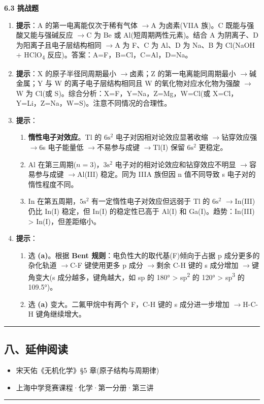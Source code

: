 \documentclass[a4paper,11pt]{ctexart}
\providecommand{\tightlist}{\setlength{\itemsep}{0pt}\setlength{\parskip}{0pt}}
\newcommand{\箭}{\ensuremath{\rightarrow}}
\newcommand{\左箭}{\ensuremath{\leftarrow}}
\newcommand{\上箭}{\ensuremath{\uparrow}}
\newcommand{\下箭}{\ensuremath{\downarrow}}
\newcommand{\衡}{\ensuremath{\rightleftharpoons}}
\newcommand{\双箭}{\ensuremath{\leftrightarrow}}
\newcommand{\约等于}{\ensuremath{\approx}}
\newcommand{\小于等于}{\ensuremath{\leq}}
\newcommand{\大于等于}{\ensuremath{\geq}}
\newcommand{\不等于}{\ensuremath{\neq}}
\newcommand{\西格马}{\ensuremath{\sigma}}
\newcommand{\派}{\ensuremath{\pi}}
\begin{document}
\textbf{6.3 挑战题}

\begin{enumerate}
\def\labelenumi{\arabic{enumi}.}
\setcounter{enumi}{10}
\item
  \textbf{提示}：A 的第一电离能仅次于稀有气体 \箭 A 为卤素(VIIA 族)。C 既能与强酸又能与强碱反应 \箭 C 为 Be 或 Al(短周期两性元素)。结合 A 为阴离子、D 为阳离子且电子层结构相同 \箭 A 为 F、C 为 Al、D 为 Na、B 为 Cl(NaOH + HClO\textsubscript{4} 反应)。答案：A=F，B=Cl，C=Al，D=Na。
\item
  \textbf{提示}：X 的原子半径同周期最小 \箭 卤素；Z 的第一电离能同周期最小 \箭 碱金属；Y 与 W 的离子电子层结构相同且 W 的氧化物对应水化物为强酸 \箭 W 为 Cl(或 S)。综合分析：X=F，Y=Na，Z=Mg，W=Cl(或 X=Cl，Y=Li，Z=Na，W=S)。注意不同情况的合理性。
\item
  \textbf{提示}：

  \begin{enumerate}
  \def\labelenumii{(\arabic{enumii})}
  \tightlist
  \item
    \textbf{惰性电子对效应}。Tl 的 \(6\mathrm{s}^2\) 电子对因相对论效应显著收缩 \箭 钻穿效应强 \箭 6s 电子能量低 \箭 不易参与成键 \箭 Tl(I) 保留 \(6\mathrm{s}^2\) 更稳定。
  \item
    Al 在第三周期(\(n=3\))，\(3\mathrm{s}^2\) 电子对的相对论效应和钻穿效应不明显 \箭 容易参与成键 \箭 Al(III) 稳定。同为 IIIA 族但因 n 值不同导致 s 电子对的惰性程度不同。
  \item
    In 在第五周期，\(5\mathrm{s}^2\) 有一定惰性电子对效应但远弱于 Tl 的 \(6\mathrm{s}^2\) \箭 In(III) 仍比 In(I) 稳定，但 In(I) 的稳定性已高于 Al(I) 和 Ga(I)。趋势：In(III) \textgreater{} In(I)，但差距缩小。
  \end{enumerate}
\item
  \textbf{提示}：

  \begin{enumerate}
  \def\labelenumii{(\arabic{enumii})}
  \tightlist
  \item
    选 \textbf{(a)}。根据 \textbf{Bent 规则}：电负性大的取代基(F)倾向于占据 p 成分更多的杂化轨道 \箭 C-F 键使用更多 p 成分 \箭 剩余 C-H 键的 s 成分增加 \箭 键角变大(s 成分越多，键角越大，如 sp 的 180° \textgreater{} sp\textsuperscript{2} 的 120° \textgreater{} sp\textsuperscript{3} 的 109.5°)。
  \item
    选 \textbf{(a)} 变大。二氟甲烷中有两个 F，C-H 键的 s 成分进一步增加 \箭 H-C-H 键角继续增大。
  \end{enumerate}
\end{enumerate}

\begin{center}\rule{0.5\linewidth}{0.5pt}\end{center}

\subsection{八、延伸阅读}\label{ux516bux5ef6ux4f38ux9605ux8bfb}

\begin{itemize}
\tightlist
\item
  宋天佑《无机化学》§5 章(原子结构与周期律)
\item
  上海中学竞赛课程·化学·第一分册·第三讲
\end{itemize}

\begin{center}\rule{0.5\linewidth}{0.5pt}\end{center}
\end{document}
